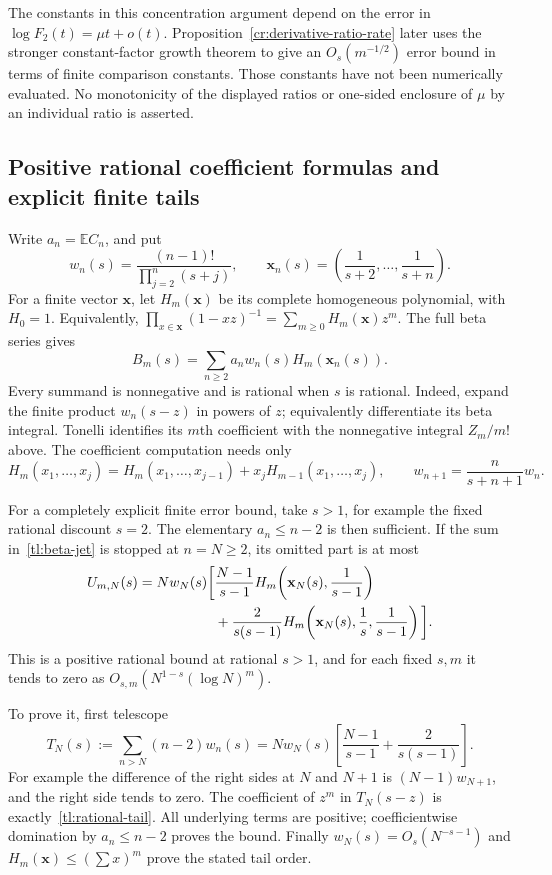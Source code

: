 The constants in this concentration argument depend on the error in
$\log F_2(t)=\mu t+o(t)$. Proposition~\ref{cr:derivative-ratio-rate}
later uses the stronger constant-factor growth theorem to give an
$O_s(m^{-1/2})$ error bound in terms of finite comparison constants.
Those constants have not been numerically evaluated. No monotonicity
of the displayed ratios or one-sided enclosure of $\mu$ by an individual
ratio is asserted.

\subsection{Positive rational coefficient formulas and explicit finite tails}

Write $a_n=\mathbb E C_n$, and put
\[
 w_n(s)=\frac{(n-1)!}{\prod_{j=2}^n(s+j)},\qquad
 \mathbf x_n(s)=\left(\frac1{s+2},\ldots,\frac1{s+n}\right).
\]
For a finite vector $\mathbf x$, let $H_m(\mathbf x)$ be its complete
homogeneous polynomial, with $H_0=1$.  Equivalently,
$\prod_{x\in\mathbf x}(1-xz)^{-1}=\sum_{m\ge0}H_m(\mathbf x)z^m$.
The full beta series gives
\begin{equation}\label{tl:beta-jet}
 \boxed{\displaystyle
 B_m(s)=\sum_{n\ge2}a_nw_n(s)H_m(\mathbf x_n(s)).}
\end{equation}
Every summand is nonnegative and is rational when $s$ is rational.
Indeed, expand the finite product $w_n(s-z)$ in powers of $z$;
equivalently differentiate its beta integral.  Tonelli identifies its
$m$th coefficient with the nonnegative integral $Z_m/m!$ above.
The coefficient computation needs only
\[
 H_m(x_1,\ldots,x_j)
 =H_m(x_1,\ldots,x_{j-1})+x_jH_{m-1}(x_1,\ldots,x_j),
 \qquad w_{n+1}=\frac{n}{s+n+1}w_n.
\]

For a completely explicit finite error bound, take $s>1$, for example
the fixed rational discount $s=2$.  The elementary $a_n\le n-2$
is then sufficient.  If the sum in~\eqref{tl:beta-jet} is stopped at
$n=N\ge2$, its omitted part is at most
\begin{align}
 U_{m,N}(s)=Nw_N(s)\bigg[&
 \frac{N-1}{s-1}
 H_m\!\left(\mathbf x_N(s),\frac1{s-1}\right)\notag\\
 &+\frac{2}{s(s-1)}
 H_m\!\left(\mathbf x_N(s),\frac1s,\frac1{s-1}\right)
 \bigg].\label{tl:rational-tail}
\end{align}
This is a positive rational bound at rational $s>1$, and for each
fixed $s,m$ it tends to zero as
$O_{s,m}(N^{1-s}(\log N)^m)$.

To prove it, first telescope
\[
 T_N(s):=\sum_{n>N}(n-2)w_n(s)
 =Nw_N(s)\left[\frac{N-1}{s-1}+\frac2{s(s-1)}\right].
\]
For example the difference of the right sides at $N$ and $N+1$ is
$(N-1)w_{N+1}$, and the right side tends to zero.  The coefficient
of $z^m$ in $T_N(s-z)$ is exactly~\eqref{tl:rational-tail}.
All underlying terms are positive; coefficientwise domination by
$a_n\le n-2$ proves the bound.  Finally $w_N(s)=O_s(N^{-s-1})$
and $H_m(\mathbf x)\le(\sum x)^m$ prove the stated tail order.

